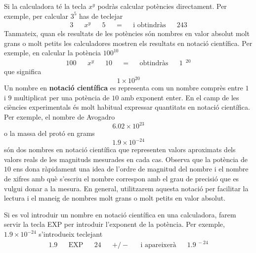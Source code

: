 Si la calculadora té la tecla $x^{y}$ podràs calcular potències
directament. Per exemple, per calcular $3^{5}$ has de teclejar%
\begin{equation*}
\begin{array}{ccccccccccc}
3 &  & x^{y} &  & 5 &  & = &  & \text{i obtindràs} &  & 243%
\end{array}%
\end{equation*}%
Tanmateix, quan els resultats de les potències són nombres en valor
absolut molt grans o molt petits les calculadores mostren els
resultats en notació científica. Per exemple, en calcular la
potència $100^{10}$%
\begin{equation*}
\begin{array}{ccccccccccc}
100 &  & x^{y} &  & 10 &  & = &  & \text{obtindràs} &  & 1~~^{20}%
\end{array}%
\end{equation*}%
que significa 
\begin{equation*}
1\times 10^{20}
\end{equation*}%
Un nombre en \textbf{notació científica} es representa com un
nombre comprès entre $1$ i $9$ multiplicat per una potència de $10$
amb exponent enter. En el camp de les ciències experimentals és molt
habitual expressar quantitats en notació científica. Per exemple,
el nombre de Avogadro 
\begin{equation*}
6.02\times 10^{23}
\end{equation*}%
o la massa del protó en grams%
\begin{equation*}
1.9\times 10^{-24}
\end{equation*}%
són dos nombres en notació científica que representen valors
aproximats dels valors reals de les magnituds mesurades en cada cas.
Observa que la potència de $10$ ens dona ràpidament una idea de l’ordre de
magnitud del nombre i el nombre de xifres amb què s’escriu el nombre correspon amb el grau de precisió que es vulgui donar a
la mesura. En general, utilitzarem aquesta notació per facilitar la
lectura i el maneig de nombres molt grans o molt petits en valor
absolut.

Si es vol introduir un nombre en notació científica en una
calculadora, farem servir la tecla EXP per introduir l’exponent de la potència.
Per exemple, $1.9\times 10^{-24}$ s’introdueix teclejant%
\begin{equation*}
\begin{array}{ccccccccccc}
1.9 &  & \text{EXP} &  & 24 &  & +/- &  & \text{i apareixerà} &  & 
1.9^{~-24}%
\end{array}%
\end{equation*}

